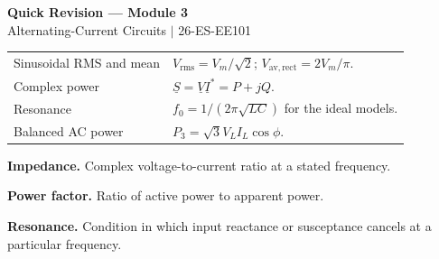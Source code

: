 \documentclass[12pt,a4paper]{article}
\renewcommand{\arraystretch}{1.45}
\begin{document}
\newpage
\begin{center}
  {\large\bfseries\color{myred} Quick Revision --- Module 3}\\[3pt]
  {\small\color{mydark} Alternating-Current Circuits $|$ 26-ES-EE101}
\end{center}
\noindent{\color{myred}\rule{\linewidth}{1.2pt}}
\vspace{4pt}

\begin{tcolorbox}[formulabox, title={Key Formulas and Concepts at a Glance}]
\renewcommand{\arraystretch}{1.35}
\begin{tabularx}{\linewidth}{B{4.4cm}Y}
Sinusoidal RMS and mean & $V_{\mathrm{rms}}=V_m/\sqrt2$; $V_{\mathrm{av,rect}}=2V_m/\pi$. \\[3pt]
Complex power & $\underline S=\underline V\underline I^*=P+jQ$. \\[3pt]
Resonance & $f_0=1/(2\pi\sqrt{LC})$ for the ideal models. \\[3pt]
Balanced AC power & $P_3=\sqrt3 V_L I_L\cos\phi$. \\[3pt]
\end{tabularx}
\end{tcolorbox}

\begin{tcolorbox}[defbox, title={One-Line Definitions}]
\textbf{Impedance.} Complex voltage-to-current ratio at a stated frequency.

\textbf{Power factor.} Ratio of active power to apparent power.

\textbf{Resonance.} Condition in which input reactance or susceptance cancels at a particular frequency.
\end{tcolorbox}
\end{document}
